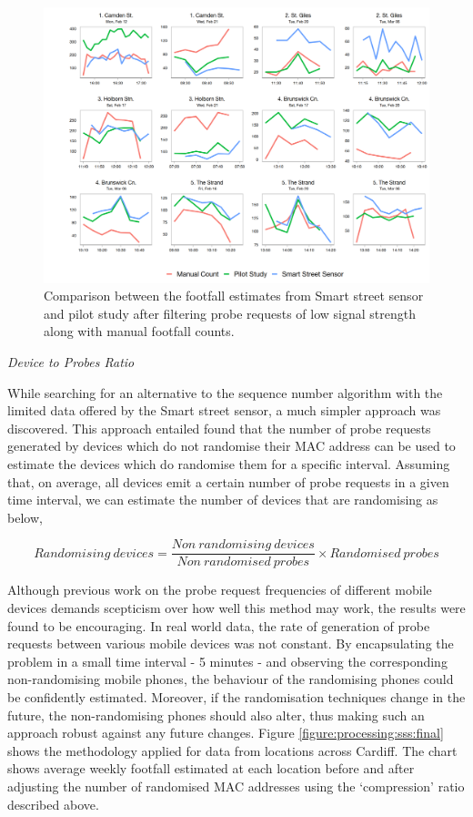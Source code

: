 \begin{figure}
  \includegraphics[trim={15 5 5 5}, clip]{images/processing-sss-compare.png}
  \caption{Comparison between the footfall estimates from Smart street sensor and pilot study after filtering probe requests of low signal strength along with manual footfall counts.}
  \label{figure:processing:sss:comparison}
\end{figure}

\vspace{1.5em}\noindent\textit{Device to Probes Ratio}\vspace{0.5em}

While searching for an alternative to the sequence number algorithm with the limited data offered by the Smart street sensor, a much simpler approach was discovered.
This approach entailed found that the number of probe requests generated by devices which do not randomise their MAC address can be used to estimate the devices which do randomise them for a specific interval.
Assuming that, on average, all devices emit a certain number of probe requests in a given time interval, we can estimate the number of devices that are randomising as below,

\[Randomising\ devices = \frac{Non\ randomising\ devices}{Non\ randomised\ probes}\times{Randomised\ probes}\]

Although previous work on the probe request frequencies of different mobile devices demands scepticism over how well this method may work, the results were found to be encouraging.
In real world data, the rate of generation of probe requests between various mobile devices was not constant.
By encapsulating the problem in a small time interval - 5 minutes - and observing the corresponding non-randomising mobile phones, the behaviour of the randomising phones could be confidently estimated.
Moreover, if the randomisation techniques change in the future, the non-randomising phones should also alter, thus making such an approach robust against any future changes.
Figure \ref{figure:processing:sss:final} shows the methodology applied for data from locations across Cardiff.
The chart shows average weekly footfall estimated at each location before and after adjusting the number of randomised MAC addresses using the ‘compression’ ratio described above.

